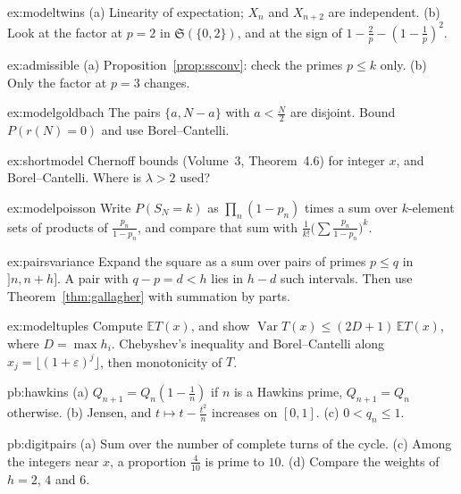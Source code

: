 \begin{hint}{ex:modeltwins}
(a) Linearity of expectation; $X_n$ and $X_{n+2}$ are independent. (b) Look at the factor at $p=2$ in $\mathfrak S(\{0,2\})$, and at the sign of $1-\frac2p-(1-\frac1p)^2$.
\end{hint}
\begin{hint}{ex:admissible}
(a) Proposition~\ref{prop:ssconv}: check the primes $p\le k$ only. (b) Only the factor at $p=3$ changes.
\end{hint}
\begin{hint}{ex:modelgoldbach}
The pairs $\{a,N-a\}$ with $a<\frac N2$ are disjoint. Bound $P(r(N)=0)$ and use Borel--Cantelli.
\end{hint}
\begin{hint}{ex:shortmodel}
Chernoff bounds (Volume~3, Theorem~4.6) for integer $x$, and Borel--Cantelli. Where is $\lambda>2$ used?
\end{hint}
\begin{hint}{ex:modelpoisson}
Write $P(S_N=k)$ as $\prod_n(1-p_n)$ times a sum over $k$-element sets of products of $\frac{p_n}{1-p_n}$, and compare that sum with $\frac1{k!}\bigl(\sum\frac{p_n}{1-p_n}\bigr)^k$.
\end{hint}
\begin{hint}{ex:pairsvariance}
Expand the square as a sum over pairs of primes $p\le q$ in $]n,n+h]$. A pair with $q-p=d<h$ lies in $h-d$ such intervals. Then use Theorem~\ref{thm:gallagher} with summation by parts.
\end{hint}
\begin{hint}{ex:modeltuples}
Compute $\mathbb ET(x)$, and show $\operatorname{Var}T(x)\le(2D+1)\,\mathbb ET(x)$, where $D=\max h_i$. Chebyshev's inequality and Borel--Cantelli along $x_j=\lfloor(1+\varepsilon)^j\rfloor$, then monotonicity of $T$.
\end{hint}

\begin{hint}{pb:hawkins}
(a) $Q_{n+1}=Q_n(1-\frac1n)$ if $n$ is a Hawkins prime, $Q_{n+1}=Q_n$ otherwise. (b) Jensen, and $t\mapsto t-\frac{t^2}n$ increases on $[0,1]$. (c) $0<q_n\le1$.
\end{hint}

\begin{hint}{pb:digitpairs}
(a) Sum over the number of complete turns of the cycle. (c) Among the integers near $x$, a proportion $\frac4{10}$ is prime to $10$. (d) Compare the weights of $h=2$, $4$ and $6$.
\end{hint}


